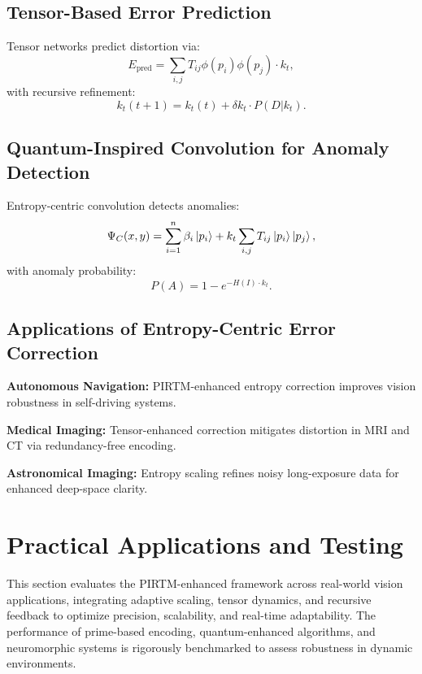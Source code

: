 \documentclass{article}
\theoremstyle{plain}
\begin{document}
\subsection{Tensor-Based Error Prediction}
Tensor networks predict distortion via:
\begin{equation}
E_\text{pred} = \sum_{i,j} T_{ij} \phi(p_i) \phi(p_j) \cdot k_t,
\end{equation}
with recursive refinement:
\begin{equation}
k_t(t+1) = k_t(t) + \delta k_t \cdot P(D | k_t).
\end{equation}

\subsection{Quantum-Inspired Convolution for Anomaly Detection}
Entropy-centric convolution detects anomalies:
\begin{equation}
\Psi_C(x, y) = \sum_{i=1}^{n} \beta_i \ket{p_i} + k_t \sum_{i,j} T_{ij} \ket{p_i} \ket{p_j},
\end{equation}
with anomaly probability:
\begin{equation}
P(A) = 1 - e^{-H(I) \cdot k_t}.
\end{equation}

\subsection{Applications of Entropy-Centric Error Correction}
\textbf{Autonomous Navigation:} PIRTM-enhanced entropy correction improves vision robustness in self-driving systems.

\textbf{Medical Imaging:} Tensor-enhanced correction mitigates distortion in MRI and CT via redundancy-free encoding.

\textbf{Astronomical Imaging:} Entropy scaling refines noisy long-exposure data for enhanced deep-space clarity.
\section{Practical Applications and Testing}
This section evaluates the PIRTM-enhanced framework across real-world vision applications, integrating adaptive scaling, tensor dynamics, and recursive feedback to optimize precision, scalability, and real-time adaptability. The performance of prime-based encoding, quantum-enhanced algorithms, and neuromorphic systems is rigorously benchmarked to assess robustness in dynamic environments.
\end{document}
